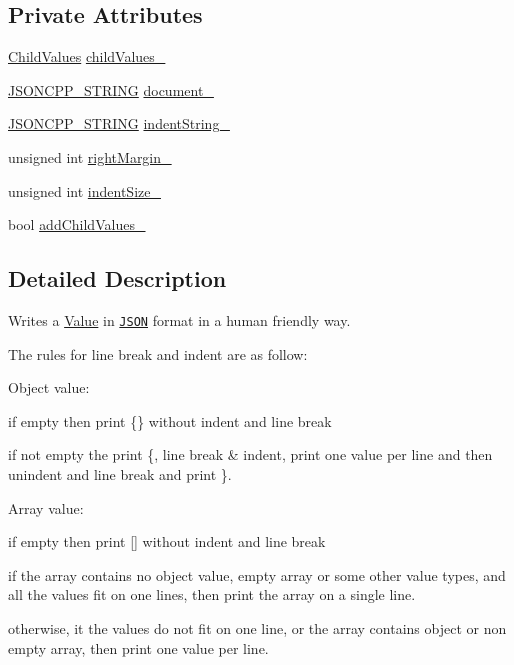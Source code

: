 \subsection*{Private Attributes}
\begin{DoxyCompactItemize}
\item 
\hyperlink{class_json_1_1_styled_writer_a798fcefa41730de612a5cf7e73003e8a}{Child\+Values} \hyperlink{class_json_1_1_styled_writer_a1f905495f0705365af117ec541e29fdf}{child\+Values\+\_\+}
\item 
\hyperlink{json_8h_a1e723f95759de062585bc4a8fd3fa4be}{J\+S\+O\+N\+C\+P\+P\+\_\+\+S\+T\+R\+I\+NG} \hyperlink{class_json_1_1_styled_writer_ae967b0c77e4d7cb889ce7b6ee4ce28d7}{document\+\_\+}
\item 
\hyperlink{json_8h_a1e723f95759de062585bc4a8fd3fa4be}{J\+S\+O\+N\+C\+P\+P\+\_\+\+S\+T\+R\+I\+NG} \hyperlink{class_json_1_1_styled_writer_a7d91709c94c152bd44eaf80faac130ae}{indent\+String\+\_\+}
\item 
unsigned int \hyperlink{class_json_1_1_styled_writer_ae648d2e1fc0f7d45c748c96805106cb0}{right\+Margin\+\_\+}
\item 
unsigned int \hyperlink{class_json_1_1_styled_writer_a0b5ab768cc56433d463eb1f03da8614e}{indent\+Size\+\_\+}
\item 
bool \hyperlink{class_json_1_1_styled_writer_acaabfa48b50a8bb7fa9ce98e2ae971d9}{add\+Child\+Values\+\_\+}
\end{DoxyCompactItemize}


\subsection{Detailed Description}
Writes a \hyperlink{class_json_1_1_value}{Value} in \href{http://www.json.org}{\tt J\+S\+ON} format in a human friendly way. 

The rules for line break and indent are as follow\+:
\begin{DoxyItemize}
\item Object value\+:
\begin{DoxyItemize}
\item if empty then print \{\} without indent and line break
\item if not empty the print \textquotesingle{}\{\textquotesingle{}, line break \& indent, print one value per line and then unindent and line break and print \textquotesingle{}\}\textquotesingle{}.
\end{DoxyItemize}
\item Array value\+:
\begin{DoxyItemize}
\item if empty then print \mbox{[}\mbox{]} without indent and line break
\item if the array contains no object value, empty array or some other value types, and all the values fit on one lines, then print the array on a single line.
\item otherwise, it the values do not fit on one line, or the array contains object or non empty array, then print one value per line.
\end{DoxyItemize}
\end{DoxyItemize}

